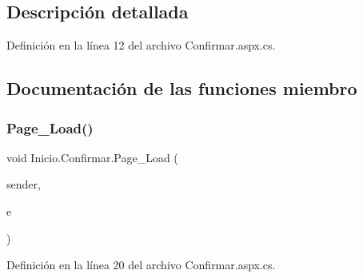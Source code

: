 \subsection{Descripción detallada}


Definición en la línea 12 del archivo Confirmar.\+aspx.\+cs.



\subsection{Documentación de las funciones miembro}
\mbox{\label{classInicio_1_1Confirmar_a47f2d7d6e91b4e672a1b954710c65daf}} 
\subsubsection{\texorpdfstring{Page\_Load()}{Page\_Load()}}
{\footnotesize\ttfamily void Inicio.\+Confirmar.\+Page\+\_\+\+Load (\begin{DoxyParamCaption}\item[{object}]{sender,  }\item[{Event\+Args}]{e }\end{DoxyParamCaption})\hspace{0.3cm}{\ttfamily [protected]}}



Definición en la línea 20 del archivo Confirmar.\+aspx.\+cs.


